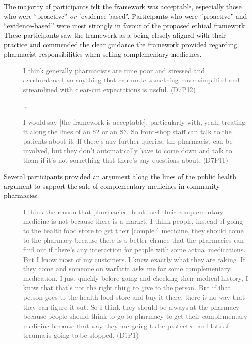 \documentclass[11pt,a4paper]{article}
\begin{document}
The majority of participants felt the framework was acceptable,
especially those who were ``proactive'' \emph{or} ``evidence-based''.
Participants who were ``proactive'' and ``evidence-based'' were most
strongly in favour of the proposed ethical framework. These participants
saw the framework as a being closely aligned with their practice and
commended the clear guidance the framework provided regarding pharmacist
responsibilities when selling complementary medicines.

\begin{quote}
I think generally pharmacists are time poor and stressed and
overburdened, so anything that can make something more simplified and
streamlined with clear-cut expectations is useful. (D7P12)
\end{quote}

\begin{quote}
\ldots{}
\end{quote}

\begin{quote}
I would say {[}the framework is acceptable{]}, particularly with, yeah,
treating it along the lines of an S2 or an S3. So front-shop staff can
talk to the patients about it. If there's any further queries, the
pharmacist can be involved, but they don't automatically have to come
down and talk to them if it's not something that there's any questions
about. (D7P11)
\end{quote}

Several participants provided an argument along the lines of the public
health argument to support the sale of complementary medicines in
community pharmacies.

\begin{quote}
I think the reason that pharmacies should sell their complementary
medicine is not because there is a market. I think people, instead of
going to the health food store to get their {[}comple?{]} medicine, they
should come to the pharmacy because there is a better chance that the
pharmacies can find out if there's any interaction for people with some
actual medications. But I know most of my customers. I know exactly what
they are taking. If they come and someone on warfarin asks me for some
complementary medication, I just quickly before going and checking their
medical history, I know that that's not the right thing to give to the
person. But if that person goes to the health food store and buy it
there, there is no way that they can figure it out. So I think they
should be always at the pharmacy because people should think to go to
pharmacy to get their complementary medicine because that way they are
going to be protected and lots of trauma is going to be stopped. (D1P1)
\end{quote}
\end{document}
